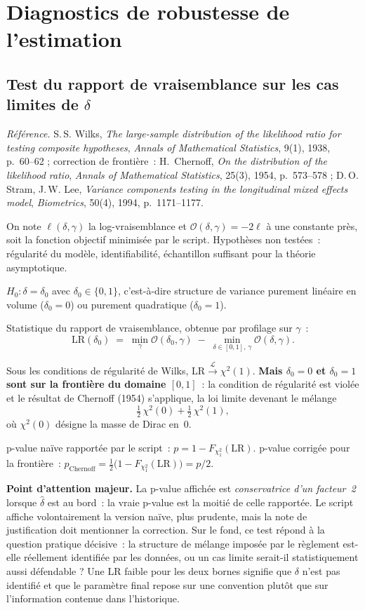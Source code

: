 \documentclass[a4paper,11pt]{article}
\newcommand{\refl}[1]{{\small\textcolor{maincolor!70!black}{\textit{Référence.} #1}}\par\smallskip}
\newcounter{ficheid}
\newenvironment{fiche}[1]{%
  \stepcounter{ficheid}%
  \phantomsection
  \subsection{#1}%
  \label{fiche:\theficheid}%
}{%
  \end{description}\vspace{0.5em}%
}
\newcommand{\Cadre}{%
  \begin{description}[leftmargin=0pt, style=unboxed, itemsep=3pt, topsep=3pt, parsep=2pt]%
  \item[\textcolor{financeblue}{\textbf{1. Cadre, notations et hypothèses de validité (non testées).}}]}
\newcommand{\Hzero}{\item[\textcolor{financeblue}{\textbf{2. Hypothèse nulle.}}]}
\newcommand{\Stat}{\item[\textcolor{financeblue}{\textbf{3. Statistique de test.}}]}
\newcommand{\Loi}{\item[\textcolor{financeblue}{\textbf{4. Loi sous $H_0$.}}]}
\newcommand{\Pval}{\item[\textcolor{financeblue}{\textbf{5. p-value.}}]}
\newcommand{\Usage}{\item[\textcolor{financeblue}{\textbf{6. Usage et limites.}}]}
\begin{document}
\newpage
\clearpage
\section{Diagnostics de robustesse de l'estimation}
\label{sec:robustesse}

\begin{fiche}{Test du rapport de vraisemblance sur les cas limites de $\delta$}
\refl{S.\,S. Wilks, \emph{The large-sample distribution of the likelihood ratio for testing
composite hypotheses}, \emph{Annals of Mathematical Statistics}, 9(1), 1938, p.~60--62 ;
correction de frontière~: H.~Chernoff, \emph{On the distribution of the likelihood ratio},
\emph{Annals of Mathematical Statistics}, 25(3), 1954, p.~573--578 ; D.\,O. Stram, J.\,W. Lee,
\emph{Variance components testing in the longitudinal mixed effects model}, \emph{Biometrics},
50(4), 1994, p.~1171--1177.}
\Cadre
On note $\ell(\delta,\gamma)$ la log-vraisemblance et $\mathcal{O}(\delta,\gamma) = -2\ell$ à une
constante près, soit la fonction objectif minimisée par le script. Hypothèses non testées~:
régularité du modèle, identifiabilité, échantillon suffisant pour la théorie asymptotique.
\Hzero
$H_0 : \delta = \delta_0$ avec $\delta_0 \in \{0, 1\}$, c'est-à-dire structure de variance purement
linéaire en volume ($\delta_0 = 0$) ou purement quadratique ($\delta_0 = 1$).
\Stat
Statistique du rapport de vraisemblance, obtenue par profilage sur $\gamma$~:
\[
  \mathrm{LR}(\delta_0) \;=\; \min_{\gamma}\mathcal{O}(\delta_0,\gamma)
                        \;-\; \min_{\delta\in[0,1],\,\gamma}\mathcal{O}(\delta,\gamma) .
\]
\Loi
Sous les conditions de régularité de Wilks,
$\mathrm{LR} \xrightarrow{\ \mathcal{L}\ } \chi^2(1)$.
\textbf{Mais $\delta_0 = 0$ et $\delta_0 = 1$ sont sur la frontière du domaine $[0,1]$}~: la
condition de régularité est violée et le résultat de Chernoff (1954) s'applique, la loi limite
devenant le mélange
\[
  \tfrac12\,\chi^2(0) + \tfrac12\,\chi^2(1),
\]
où $\chi^2(0)$ désigne la masse de Dirac en~0.
\Pval
p-value naïve rapportée par le script~: $p = 1 - F_{\chi^2_1}(\mathrm{LR})$.
p-value corrigée pour la frontière~:
$p_{\text{Chernoff}} = \tfrac12\big(1 - F_{\chi^2_1}(\mathrm{LR})\big) = p/2$.
\Usage
\textbf{Point d'attention majeur.} La p-value affichée est \emph{conservatrice d'un facteur~2}
lorsque $\hat\delta$ est au bord~: la vraie p-value est la moitié de celle rapportée. Le script
affiche volontairement la version naïve, plus prudente, mais la note de justification doit
mentionner la correction. Sur le fond, ce test répond à la question pratique décisive~: la
structure de mélange imposée par le règlement est-elle réellement identifiée par les données, ou
un cas limite serait-il statistiquement aussi défendable ? Une $\mathrm{LR}$ faible pour les deux
bornes signifie que $\delta$ n'est pas identifié et que le paramètre final repose sur une
convention plutôt que sur l'information contenue dans l'historique.
\end{fiche}
\end{document}
